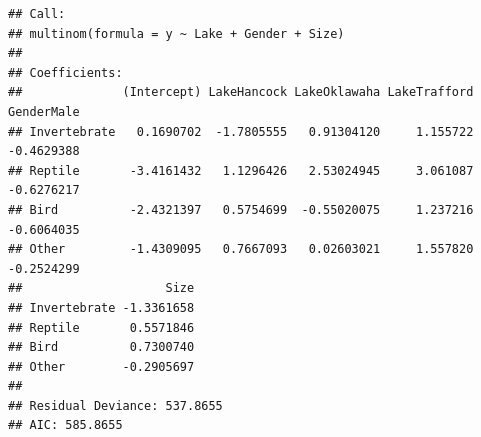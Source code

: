 \documentclass[
]{article}
\begin{document}
\begin{verbatim}
## Call:
## multinom(formula = y ~ Lake + Gender + Size)
## 
## Coefficients:
##              (Intercept) LakeHancock LakeOklawaha LakeTrafford GenderMale
## Invertebrate   0.1690702  -1.7805555   0.91304120     1.155722 -0.4629388
## Reptile       -3.4161432   1.1296426   2.53024945     3.061087 -0.6276217
## Bird          -2.4321397   0.5754699  -0.55020075     1.237216 -0.6064035
## Other         -1.4309095   0.7667093   0.02603021     1.557820 -0.2524299
##                    Size
## Invertebrate -1.3361658
## Reptile       0.5571846
## Bird          0.7300740
## Other        -0.2905697
## 
## Residual Deviance: 537.8655 
## AIC: 585.8655
\end{verbatim}
\end{document}
